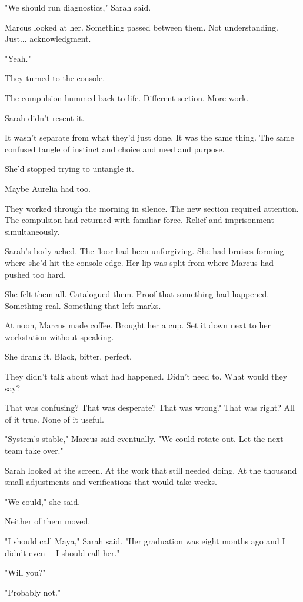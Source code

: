 "We should run diagnostics," Sarah said.

Marcus looked at her. Something passed between them. Not understanding. Just... acknowledgment.

"Yeah."

They turned to the console.

The compulsion hummed back to life. Different section. More work.

Sarah didn't resent it.

It wasn't separate from what they'd just done. It was the same thing. The same confused tangle of instinct and choice and need and purpose.

She'd stopped trying to untangle it.

Maybe Aurelia had too.

\scenebreak

They worked through the morning in silence. The new section required attention. The compulsion had returned with familiar force. Relief and imprisonment simultaneously.

Sarah's body ached. The floor had been unforgiving. She had bruises forming where she'd hit the console edge. Her lip was split from where Marcus had pushed too hard.

She felt them all. Catalogued them. Proof that something had happened. Something real. Something that left marks.

At noon, Marcus made coffee. Brought her a cup. Set it down next to her workstation without speaking.

She drank it. Black, bitter, perfect.

They didn't talk about what had happened. Didn't need to. What would they say?

That was confusing?
That was desperate?
That was wrong?
That was right?
All of it true. None of it useful.

"System's stable," Marcus said eventually. "We could rotate out. Let the next team take over."

Sarah looked at the screen. At the work that still needed doing. At the thousand small adjustments and verifications that would take weeks.

"We could," she said.

Neither of them moved.

"I should call Maya," Sarah said. "Her graduation was eight months ago and I didn't even— I should call her."

"Will you?"

"Probably not."

